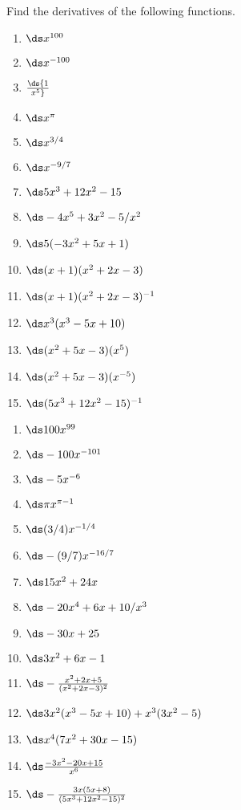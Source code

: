 \begin{enumialphparenastyle}

\begin{ex} 
Find the derivatives of the following functions.
\begin{multicols}{3}
\begin{enumerate}
	\item	$\ds x^{100}$
	\item	$\ds x^{-100}$
	\item	$\ds {1\over x^5}$
	\item	$\ds x^\pi$
	\item	$\ds x^{3/4}$
	\item	$\ds x^{-9/7}$
	\item	$\ds 5x^3+12x^2-15$
	\item	$\ds -4x^5 + 3x^2 - 5/x^2$
	\item	$\ds 5(-3x^2 + 5x + 1)$
	\item	$\ds (x+1)(x^2+2x-3)$
	\item	$\ds (x+1)(x^2+2x-3)^{-1}$
	\item	$\ds x^3(x^3-5x+10)$
	\item	$\ds (x^2+5x-3)(x^5)$
	\item	$\ds (x^2+5x-3)(x^{-5})$
	\item	$\ds (5x^3+12x^2-15)^{-1}$
\end{enumerate}
\end{multicols}
\begin{sol}
\begin{multicols}{3}
\begin{enumerate}
	\item	$\ds 100x^{99}$
	\item	$\ds -100x^{-101}$
	\item	$\ds -5x^{-6}$
	\item	$\ds \pi x^{\pi-1}$
	\item	$\ds (3/4)x^{-1/4}$
	\item	$\ds -(9/7)x^{-16/7}$
	\item	$\ds 15x^2+24x$
	\item	$\ds -20x^4+6x+10/x^3$
	\item	$\ds -30x+25$
	\item	$\ds 3x^2+6x-1$
	\item	$\ds -\frac{x^2+2x+5}{(x^2+2x-3)^2}$
	\item	$\ds 3x^2(x^3-5x+10)+x^3(3x^2-5)$ 
	\item	$\ds x^4(7x^2+30x-15)$
	\item	$\ds\frac{-3x^2-20x+15}{x^6}$
	\item	$\ds -\frac{3x(5x+8)}{(5x^3+12x^2-15)^2}$ 
\end{enumerate}
\end{multicols}
\end{sol} 
\end{ex}


\end{enumialphparenastyle}
